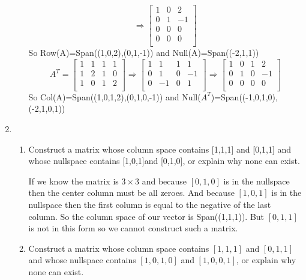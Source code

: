 \documentclass[letterpaper]{article}
\begin{document}
\begin{enumerate}
\begin{enumerate}
\[  \Rightarrow
  \left[\begin{array}{rrr}
    1&0&2\\
    0&1&-1\\
    0&0&0\\
    0&0&0\\
  \end{array}\right]
  \]
  So Row(A)=Span((1,0,2),(0,1,-1)) and Null(A)=Span((-2,1,1))
  \[
  A^T=
  \left[\begin{array}{rrrr}
    1&1&1&1\\
    1&2&1&0\\
    1&0&1&2\\
  \end{array}\right]
  \Rightarrow
  \left[\begin{array}{rrrr}
    1& 1&1& 1\\
    0& 1&0&-1\\
    0&-1&0& 1\\
  \end{array}\right]
  \Rightarrow
  \left[\begin{array}{rrrr}
    1& 0&1& 2\\
    0& 1&0&-1\\
    0& 0&0& 0\\
  \end{array}\right]
  \]
  So Col(A)=Span((1,0,1,2),(0,1,0,-1)) and Null($A^T$)=Span((-1,0,1,0),(-2,1,0,1))
  \end{enumerate}
\setcounter{enumi}{5}
\item
  \begin{enumerate}
  \item
  Construct a matrix whose column space contains [1,1,1] and [0,1,1] and whose nullspace contains [1,0,1]and [0,1,0], or explain why none can exist.

  If we know the matrix is $3\times 3$ and because $[0,1,0]$ is in the nullspace then the center column must be all zeroes. And because $[1,0,1]$ is in the nullspace then the first column is equal to the negative of the last column. So the column space of our vector is Span((1,1,1)). But $[0,1,1]$ is not in this form so we cannot construct such a matrix.
  \item
  Construct a matrix whose column space contains $[1,1,1]$ and $[0,1,1]$ and whose nullspace contains $[1,0,1,0]$ and $[1,0,0,1]$, or explain why none can exist.


\end{enumerate}
\end{enumerate}
\end{document}
